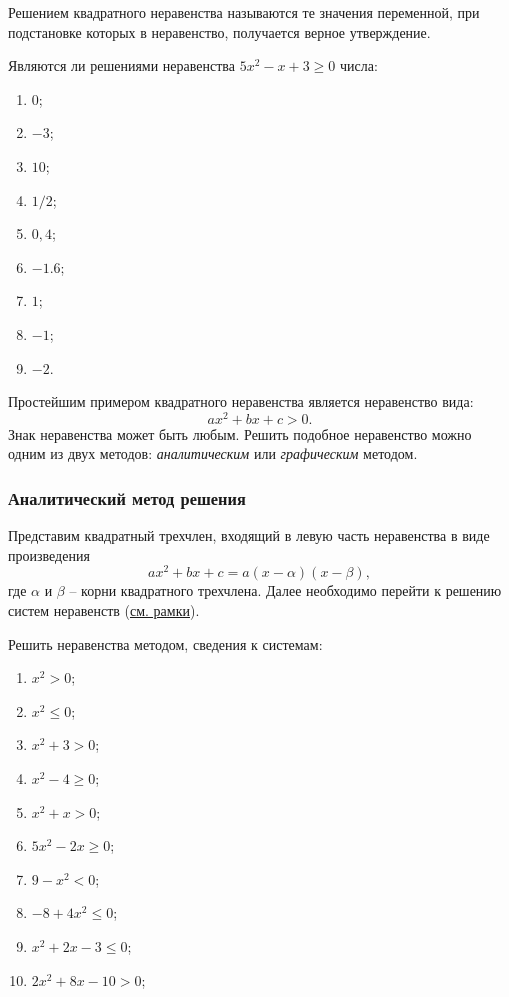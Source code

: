 \documentclass[algebra,twocolumn]{pum}
\begin{document}
Решением квадратного неравенства называются те значения переменной, при подстановке которых в неравенство, получается верное утверждение.

\begin{exercises}
  \begin{question}
      Являются ли решениями неравенства $5x^2-x+3\ge0$ числа:
      \begin{multicols}{3}
        \begin{enumerate}
          \item $0$;
          \item $-3$;
          \item $10$;
          \item $1/2$;
          \item $0,4$;
          \item $-1.6$;
          \item $1$;
          \item $-1$;
          \item $-2$.
        \end{enumerate}
      \end{multicols}
  \end{question}
\end{exercises}

Простейшим примером квадратного неравенства является неравенство вида:
$$ax^2+bx+c>0.$$
Знак неравенства может быть любым. Решить подобное неравенство можно одним из двух методов: \emph{аналитическим} или \emph{графическим} методом.

\subsubsection*{Аналитический метод решения}

Представим квадратный трехчлен, входящий в левую часть неравенства в виде произведения
$$ax^2+bx+c=a(x-\alpha)(x-\beta),$$
где $\alpha$ и $\beta$ -- корни квадратного трехчлена. Далее необходимо перейти к решению систем неравенств (\href{tcb:systems}{см. рамки}).

\begin{exercises}
  \begin{question}
    Решить неравенства методом, сведения к системам:
    \begin{multicols}{2}
    \begin{enumerate}
      \item $x^2>0$;
      \item $x^2\le0$;
      \item $x^2+3>0$;
      \item $x^2-4\ge0$;
      \item $x^2+x>0$;
      \item $5x^2-2x\ge0$;
      \item $9-x^2<0$;
      \item $-8+4x^2\le0$;
      \item $x^2+2x-3\le0$;
      \item $2x^2+8x-10>0$;
    \end{enumerate}
    \end{multicols}
  \end{question}
\end{exercises}
\end{document}
